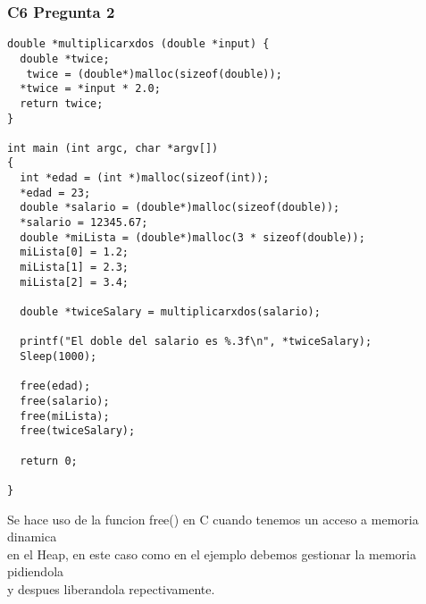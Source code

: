 \subsubsection{C6 Pregunta 2}

\begin{lstlisting}
double *multiplicarxdos (double *input) {
  double *twice;
   twice = (double*)malloc(sizeof(double));
  *twice = *input * 2.0;
  return twice;
}

int main (int argc, char *argv[])
{
  int *edad = (int *)malloc(sizeof(int));
  *edad = 23;
  double *salario = (double*)malloc(sizeof(double));
  *salario = 12345.67;
  double *miLista = (double*)malloc(3 * sizeof(double));
  miLista[0] = 1.2;
  miLista[1] = 2.3;
  miLista[2] = 3.4;

  double *twiceSalary = multiplicarxdos(salario);

  printf("El doble del salario es %.3f\n", *twiceSalary);
  Sleep(1000);

  free(edad);
  free(salario);
  free(miLista);
  free(twiceSalary);

  return 0;

}
 \end{lstlisting}
Se hace uso de la funcion free() en C cuando tenemos un acceso a memoria dinamica \\
en el Heap, en este caso como en el ejemplo debemos gestionar la memoria pidiendola \\
y despues liberandola repectivamente.